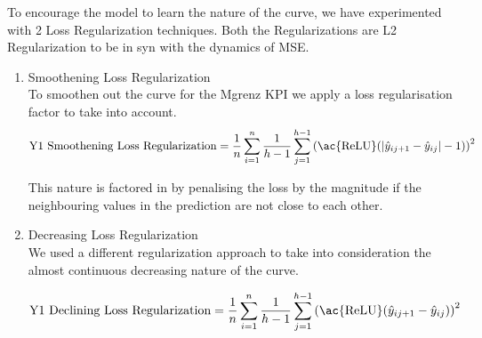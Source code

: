 \documentclass{report} %
\begin{document}
\vspace{0.2cm} %


To encourage the model to learn the nature of the curve, we have experimented with 2 Loss Regularization techniques. Both the Regularizations are L2 Regularization to be in syn with the dynamics of \ac{MSE}.\\

\begin{enumerate}

    \item Smoothening Loss Regularization \\

To smoothen out the curve for the Mgrenz \ac{KPI} we apply a loss regularisation factor to take into account.\\


\begin{equation}
\text{Y1 Smoothening Loss Regularization} = \frac{1}{n} \sum_{i=1}^{n}\frac{1}{h-1} \sum_{j=1}^{h-1} \left(\text{\ac{ReLU}}(|\hat{y}_{i{j+1}} - \hat{y}_{ij}| - 1)\right)^2 
\label{eq:Y1 Smoothening Loss Regularization}
\end{equation} 

\vspace{0.2cm} %

This nature is factored in by penalising the loss by the magnitude if the neighbouring values in the prediction are not close to each other.\\

\item Decreasing Loss Regularization \\

We used a different regularization approach to take into consideration the almost continuous decreasing nature of the curve.

\begin{equation}
    \text{Y1 Declining Loss Regularization} = \frac{1}{n} \sum_{i=1}^{n}\frac{1}{h-1} \sum_{j=1}^{h-1} \left(\text{\ac{ReLU}}(\hat{y}_{i{j+1}} - \hat{y}_{ij})\right)^2
    \label{eq:Y1 Declining Loss Regularization}
\end{equation} 
    


\end{enumerate}
\end{document}
